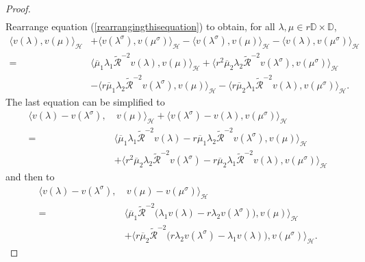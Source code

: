 \documentclass[10pt,a4paper]{amsart}
\begin{document}
\begin{proof}
\begin{align}
\end{align}
Rearrange equation (\ref{rearrangingthisequation}) to obtain, for all $\lambda,\mu\in r\mathbb{D}\times \mathbb{D}$,
\begin{align*}
\Big\langle v(\lambda), v(\mu) \Big\rangle_{\mathcal{H}} &+ \Big\langle v(\lambda^{\sigma}),v(\mu^{\sigma})\Big\rangle_{\mathcal{H}}
- \Big\langle v(\lambda^{\sigma}), v(\mu)\Big\rangle_{\mathcal{H}} - \Big\langle v(\lambda), v(\mu^{\sigma})\Big\rangle_{\mathcal{H}} \\
=&\Big\langle \overline{\mu}_{1}\lambda_{1} \widetilde{\mathcal{R}}^{-2} v(\lambda), v(\mu)\Big\rangle_{\mathcal{H}} +\Big\langle r^{2}\overline{\mu}_{2}\lambda_{2}\widetilde{\mathcal{R}}^{-2}v(\lambda^{\sigma}), v(\mu^{\sigma}) \Big\rangle_{\mathcal{H}} \\
&- \Big\langle r\overline{\mu}_{1}\lambda_{2}\widetilde{\mathcal{R}}^{-2}v(\lambda^{\sigma}), v(\mu) \Big\rangle_{\mathcal{H}} -\Big\langle r\overline{\mu}_{2}\lambda_{1}\widetilde{\mathcal{R}}^{-2}v(\lambda),v(\mu^{\sigma})\Big\rangle_{\mathcal{H}}.
\end{align*}
The last  equation can be simplified to 
\begin{align*}
\Big\langle v(\lambda) - v(\lambda^{\sigma}), & \ v(\mu)\Big\rangle_{\mathcal{H}} + \Big\langle v(\lambda^{\sigma})-v(\lambda), v(\mu^{\sigma})\Big\rangle_{\mathcal{H}} \\
 =&\Big\langle \overline{\mu}_{1}\lambda_{1} \widetilde{\mathcal{R}}^{-2} v(\lambda)-r\overline{\mu}_{1}\lambda_{2}\widetilde{\mathcal{R}}^{-2}v(\lambda^{\sigma}), v(\mu)\Big\rangle_{\mathcal{H}} \\
&+ \Big\langle r^{2}\overline{\mu}_{2}\lambda_{2}\widetilde{\mathcal{R}}^{-2}v(\lambda^{\sigma}) - r\overline{\mu}_{2}\lambda_{1}\widetilde{\mathcal{R}}^{-2}v(\lambda),v(\mu^{\sigma}) \Big\rangle_{\mathcal{H}} 
\end{align*}
and then to
\begin{align}\label{right-form-1}
\Big\langle v(\lambda) - v(\lambda^{\sigma}), & \ v(\mu)-v(\mu^{\sigma})\Big\rangle_{\mathcal{H}} \nonumber \\
=&\Big\langle \overline{\mu}_{1}\widetilde{\mathcal{R}}^{-2}\big(\lambda_{1} v(\lambda)-r\lambda_{2}v(\lambda^{\sigma})\big), v(\mu)\Big\rangle_{\mathcal{H}} \nonumber \\
&+\Big\langle r\overline{\mu}_{2}\widetilde{\mathcal{R}}^{-2}\big(r\lambda_{2}v(\lambda^{\sigma}) - \lambda_{1}v(\lambda)\big),v(\mu^{\sigma}) \Big\rangle_{\mathcal{H}} .
\end{align}

\end{proof}
\end{document}
